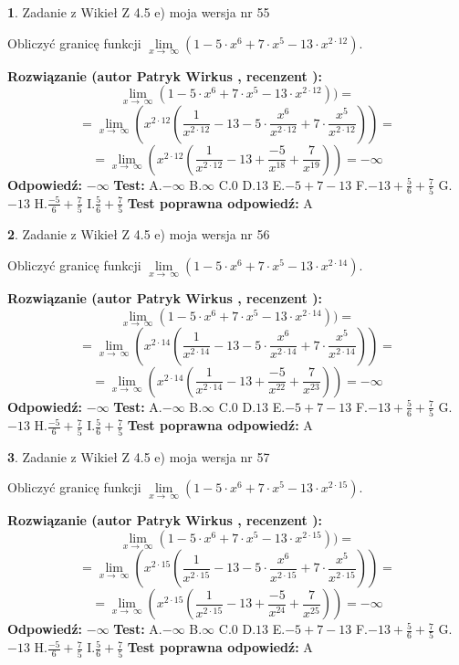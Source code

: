 \documentclass[12pt, a4paper]{article}
\theoremstyle{definition} %
\newtheorem{zad}{}
\newcommand{\zadStart}[1]{\begin{zad}#1\newline}
\newcommand{\zadStop}{\end{zad}}
\newcommand{\rozwStart}[2]{\noindent \textbf{Rozwiązanie (autor #1 , recenzent #2): }\newline}
\newcommand{\rozwStop}{\newline}
\newcommand{\odpStart}{\noindent \textbf{Odpowiedź:}\newline}
\newcommand{\odpStop}{\newline}
\newcommand{\testStart}{\noindent \textbf{Test:}\newline}
\newcommand{\testStop}{\newline}
\newcommand{\kluczStart}{\noindent \textbf{Test poprawna odpowiedź:}\newline}
\newcommand{\kluczStop}{\newline}
\begin{document}
\zadStart{Zadanie z Wikieł Z 4.5 e) moja wersja nr 55}



Obliczyć granicę funkcji  $\lim\limits_{x\to\ \infty}(1 - 5 \cdot x^{6}+7 \cdot x^{5}- 13 \cdot x^{2\cdot12})$.
\zadStop
\rozwStart{Patryk Wirkus}{}
$$\lim\limits_{x\to\ \infty}(1 - 5 \cdot x^{6}+7 \cdot x^{5}- 13 \cdot x^{2\cdot12}))=$$
$$=\lim\limits_{x\to\ \infty}(x^{2\cdot12}(\frac{1}{x^{2\cdot12}}-13 -5 \cdot \frac{x^{6}}{x^{2\cdot12}}+7 \cdot \frac{x^{5}}{x^{2\cdot12}}))=$$
$$=\lim\limits_{x\to\ \infty}(x^{2\cdot12}(\frac{1}{x^{2\cdot12}}-13 + \frac{-5}{x^{18}}+ \frac{7}{x^{19}}))=-\infty$$
\rozwStop
\odpStart
$-\infty$
\odpStop
\testStart
A.$-\infty$ B.$\infty$ C.$0$ D.$13$ E.$-5 + 7 - 13$
F.$-13+\frac{5}{6}+\frac{7}{5}$ G.$-13$
H.$\frac{-5}{6}+\frac{7}{5}$
I.$\frac{5}{6}+\frac{7}{5}$
\testStop
\kluczStart
A
\kluczStop



\zadStart{Zadanie z Wikieł Z 4.5 e) moja wersja nr 56}



Obliczyć granicę funkcji  $\lim\limits_{x\to\ \infty}(1 - 5 \cdot x^{6}+7 \cdot x^{5}- 13 \cdot x^{2\cdot14})$.
\zadStop
\rozwStart{Patryk Wirkus}{}
$$\lim\limits_{x\to\ \infty}(1 - 5 \cdot x^{6}+7 \cdot x^{5}- 13 \cdot x^{2\cdot14}))=$$
$$=\lim\limits_{x\to\ \infty}(x^{2\cdot14}(\frac{1}{x^{2\cdot14}}-13 -5 \cdot \frac{x^{6}}{x^{2\cdot14}}+7 \cdot \frac{x^{5}}{x^{2\cdot14}}))=$$
$$=\lim\limits_{x\to\ \infty}(x^{2\cdot14}(\frac{1}{x^{2\cdot14}}-13 + \frac{-5}{x^{22}}+ \frac{7}{x^{23}}))=-\infty$$
\rozwStop
\odpStart
$-\infty$
\odpStop
\testStart
A.$-\infty$ B.$\infty$ C.$0$ D.$13$ E.$-5 + 7 - 13$
F.$-13+\frac{5}{6}+\frac{7}{5}$ G.$-13$
H.$\frac{-5}{6}+\frac{7}{5}$
I.$\frac{5}{6}+\frac{7}{5}$
\testStop
\kluczStart
A
\kluczStop



\zadStart{Zadanie z Wikieł Z 4.5 e) moja wersja nr 57}



Obliczyć granicę funkcji  $\lim\limits_{x\to\ \infty}(1 - 5 \cdot x^{6}+7 \cdot x^{5}- 13 \cdot x^{2\cdot15})$.
\zadStop
\rozwStart{Patryk Wirkus}{}
$$\lim\limits_{x\to\ \infty}(1 - 5 \cdot x^{6}+7 \cdot x^{5}- 13 \cdot x^{2\cdot15}))=$$
$$=\lim\limits_{x\to\ \infty}(x^{2\cdot15}(\frac{1}{x^{2\cdot15}}-13 -5 \cdot \frac{x^{6}}{x^{2\cdot15}}+7 \cdot \frac{x^{5}}{x^{2\cdot15}}))=$$
$$=\lim\limits_{x\to\ \infty}(x^{2\cdot15}(\frac{1}{x^{2\cdot15}}-13 + \frac{-5}{x^{24}}+ \frac{7}{x^{25}}))=-\infty$$
\rozwStop
\odpStart
$-\infty$
\odpStop
\testStart
A.$-\infty$ B.$\infty$ C.$0$ D.$13$ E.$-5 + 7 - 13$
F.$-13+\frac{5}{6}+\frac{7}{5}$ G.$-13$
H.$\frac{-5}{6}+\frac{7}{5}$
I.$\frac{5}{6}+\frac{7}{5}$
\testStop
\kluczStart
A
\kluczStop
\end{document}
